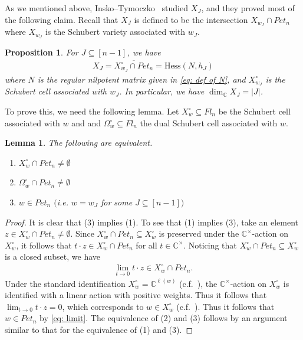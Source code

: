 \documentclass[11pt]{article}
\newtheorem{lemma}[theo]{Lemma}
\newtheorem{prop}[theo]{Proposition}
\theoremstyle{definition}
\numberwithin{equation}{section}
\numberwithin{equation}{section}
\begin{document}
As we mentioned above, Insko--Tymoczko~\cite{Insko-Tymoczko} studied $X_J$, and they proved most of the following claim. Recall that $X_J$ is defined to be the intersection $X_{w_J}\cap Pet_{n}$ where $X_{w_J}$ is the Schubert variety associated with $w_J$. 

\begin{prop}\label{prop: XJ and Hess}
For $J\subseteq [n-1]$, we have
\begin{align}\label{eq: two equalities}
 X_J = \overline{X^{\circ}_{w_J}\cap Pet_{n}} = \text{Hess}(N,h_J)
\end{align}
where $N$ is the regular nilpotent matrix given in \eqref{eq: def of N}, and $X^{\circ}_{w_J}$ is the Schubert cell associated with $w_J$. In particular, we have $\dim_{{\mathbb C}} X_J = |J|$.
\end{prop}

To prove this, we need the following lemma. Let $X^{\circ}_{w}\subseteq Fl_n$ be the Schubert cell associated with $w$ and and $\Omega^{\circ}_w\subseteq Fl_n$ the dual Schubert cell associated with $w$.

\begin{lemma}\label{lem: intersection with dual cell}
The following are equivalent.
\begin{enumerate}
 \item $X^{\circ}_w\cap Pet_{n}\ne\emptyset$
 \item $\Omega^{\circ}_w\cap Pet_{n}\ne\emptyset$
 \item $w\in Pet_{n}$ $($i.e. $w=w_J$ for some $J\subseteq[n-1])$
\end{enumerate}
\end{lemma}

\begin{proof}
It is clear that (3) implies (1). To see that (1) implies (3), take an  element $z\in X^{\circ}_w\cap Pet_{n}\ne\emptyset$. Since $X^{\circ}_w\cap Pet_{n}\subseteq X^{\circ}_w$ is preserved under the ${\mathbb C}^{\times}$-action on $X^{\circ}_w$, it follows that $t\cdot z\in X^{\circ}_w\cap Pet_{n}$ for all $t\in {\mathbb C}^{\times}$. Noticing that $X^{\circ}_w\cap Pet_{n}\subseteq X^{\circ}_w$ is a closed subset, we have 
\begin{align}\label{eq: limit}
\lim_{t\rightarrow0}t\cdot z\in X^{\circ}_w\cap Pet_{n}.
\end{align}
Under the standard identification $X^{\circ}_w = {\mathbb C}^{\ell(w)}$ (c.f.~\cite[Sect.\ 10.2]{fult97}), the ${\mathbb C}^{\times}$-action on $X^{\circ}_w$ is identified with a linear action with positive weights. Thus it follows that $\lim_{t\rightarrow0}t\cdot z=0$, which corresponds to $w\in X^{\circ}_w$ (c.f.~\cite[proof of Lemma~5]{Insko-Tymoczko}). Thus it follows that $w\in Pet_{n}$ by \eqref{eq: limit}. The equivalence of (2) and (3) follows by an argument similar to that for the equivalence of (1) and (3).
\end{proof}
\end{document}
